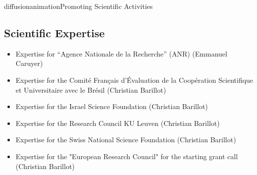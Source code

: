 \documentclass{ra2018}
\begin{document}
\begin{module}{diffusion}{animation}{Promoting Scientific Activities}
\subsection{Scientific Expertise}
\begin{itemize}
    \item Expertise for ``Agence Nationale de la Recherche'' (ANR) (Emmanuel Caruyer)
    \item Expertise for the Comité Français d'Évaluation de la Coopération Scientifique et Universitaire avec le Brésil (Christian Barillot)
    \item Expertise for the Israel Science Foundation  (Christian Barillot)
    \item Expertise for the Research Council KU Leuven  (Christian Barillot)
    \item Expertise for the Swiss National Science Foundation  (Christian Barillot)
    \item Expertise for the "European Research Council" for the starting grant call (Christian Barillot)
\end{itemize}

  
\end{module}
\end{document}
